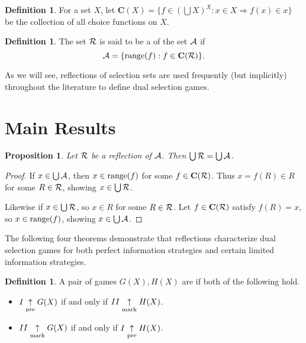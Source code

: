 \documentclass{amsart}
\theoremstyle{plain}
\newtheorem{proposition}[theorem]{Proposition}
\theoremstyle{definition}
\newtheorem{definition}[theorem]{Definition}
\theoremstyle{remark}
\theoremstyle{plain}
\theoremstyle{definition}
\theoremstyle{remark}
\begin{document}
\begin{definition}
  For a set \(X\), let \(\mathbf C(X)=\{f\in(\bigcup X)^X:x\in X\Rightarrow f(x)\in x\}\)
  be the collection of all choice functions on \(X\).
\end{definition}

\begin{definition}
  The set \(\mathcal{R}\) is said to be a  of the set \(\mathcal{A}\)
  if \[\mathcal{A}= \{\text{range}(f):f\in\mathbf C(\mathcal{R})\}.\]
\end{definition}

As we will see, reflections of selection sets are used frequently (but implicitly) 
throughout the literature to define dual selection games.


\section{Main Results}

\begin{proposition}
  Let \(\mathcal{R}\) be a reflection of \(\mathcal{A}\). Then \(\bigcup \mathcal{R}=\bigcup \mathcal{A}\).
\end{proposition}
\begin{proof}
  If \(x\in \bigcup\mathcal{A}\), then \(x\in\text{range}(f)\) for some \(f\in\mathbf C(\mathcal{R})\).
  Thus \(x=f(R)\in R\) for some \(R\in\mathcal{R}\), showing \(x\in\bigcup\mathcal{R}\).

  Likewise if \(x\in\bigcup\mathcal{R}\), so \(x\in R\) for some \(R\in \mathcal{R}\).
  Let \(f\in\mathbf C(\mathcal{R})\) satisfy \(f(R)=x\), so \(x\in\text{range}(f)\),
  showing \(x\in\bigcup\mathcal{A}\).
\end{proof}

The following four theorems demonstrate that reflections characterize
dual selection games for both perfect information strategies and
certain limited information strategies.

\begin{definition}
  A pair of games \(G(X),H(X)\) are  if both
  of the following hold.
  \begin{itemize}
    \item \(I\underset{\text{pre}}{\uparrow} G(X)\) if and only if \(II\underset{\text{mark}}{\uparrow} H(X)\).
    \item \(II\underset{\text{mark}}{\uparrow} G(X)\) if and only if \(I\underset{\text{pre}}{\uparrow} H(X)\).
  \end{itemize}
\end{definition}
\end{document}
